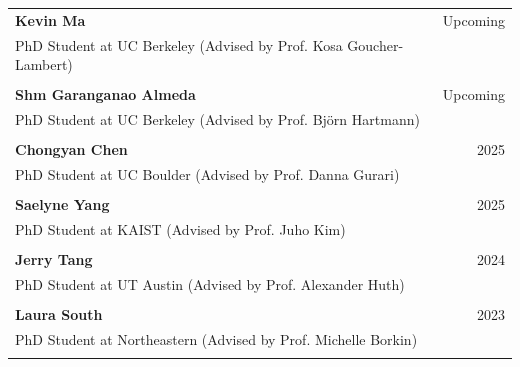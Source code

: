 \begin{longtable}{Xr}
	\textbf{Kevin Ma} & Upcoming \\
	PhD Student at UC Berkeley (Advised by Prof. Kosa Goucher-Lambert) &  \\
	\\

	\textbf{Shm Garanganao Almeda} & Upcoming \\
	PhD Student at UC Berkeley (Advised by Prof. Björn Hartmann) &  \\
	\\

	\textbf{Chongyan Chen} & 2025 \\
	PhD Student at UC Boulder (Advised by Prof. Danna Gurari) &  \\
	\\

	\textbf{Saelyne Yang} & 2025 \\
	PhD Student at KAIST (Advised by Prof. Juho Kim) &  \\
	\\

	\textbf{Jerry Tang} & 2024 \\
	PhD Student at UT Austin (Advised by Prof. Alexander Huth) &  \\
	\\

	\textbf{Laura South} & 2023 \\
	PhD Student at Northeastern (Advised by Prof. Michelle Borkin) &  \\
	\\

\end{longtable}